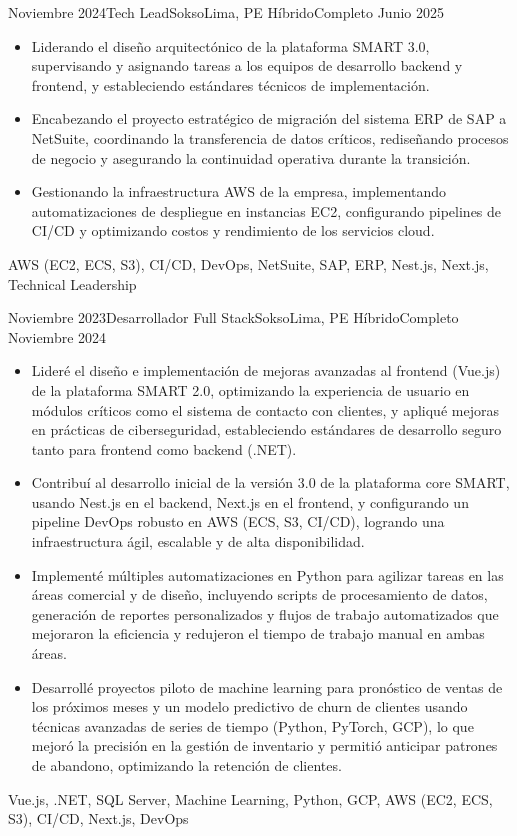 \begin{experiences}
\experience
  {Noviembre 2024}{Tech Lead}{Sokso}{Lima, PE}
  {Híbrido}{Completo}
  {Junio 2025} {
    \begin{itemize}
      \item Liderando el diseño arquitectónico de la plataforma SMART 3.0, supervisando y asignando tareas a los equipos de desarrollo backend y frontend, y estableciendo estándares técnicos de implementación.
      \item Encabezando el proyecto estratégico de migración del sistema ERP de SAP a NetSuite, coordinando la transferencia de datos críticos, rediseñando procesos de negocio y asegurando la continuidad operativa durante la transición.
      \item Gestionando la infraestructura AWS de la empresa, implementando automatizaciones de despliegue en instancias EC2, configurando pipelines de CI/CD y optimizando costos y rendimiento de los servicios cloud.
    \end{itemize}
  }
  {{AWS (EC2, ECS, S3)}, CI/CD, DevOps, NetSuite, SAP, ERP, Nest.js, Next.js, Technical Leadership}

\experience
  {Noviembre 2023}{Desarrollador Full Stack}{Sokso}{Lima, PE}
  {Híbrido}{Completo}
  {Noviembre 2024} {
    \begin{itemize}
      \item Lideré el diseño e implementación de mejoras avanzadas al frontend (Vue.js) de la plataforma SMART 2.0, optimizando la experiencia de usuario en módulos críticos como el sistema de contacto con clientes, y apliqué mejoras en prácticas de ciberseguridad, estableciendo estándares de desarrollo seguro tanto para frontend como backend (.NET).
      \item Contribuí al desarrollo inicial de la versión 3.0 de la plataforma core SMART, usando Nest.js en el backend, Next.js en el frontend, y configurando un pipeline DevOps robusto en AWS (ECS, S3, CI/CD), logrando una infraestructura ágil, escalable y de alta disponibilidad.
      \item Implementé múltiples automatizaciones en Python para agilizar tareas en las áreas comercial y de diseño, incluyendo scripts de procesamiento de datos, generación de reportes personalizados y flujos de trabajo automatizados que mejoraron la eficiencia y redujeron el tiempo de trabajo manual en ambas áreas.
      \item Desarrollé proyectos piloto de machine learning para pronóstico de ventas de los próximos meses y un modelo predictivo de churn de clientes usando técnicas avanzadas de series de tiempo (Python, PyTorch, GCP), lo que mejoró la precisión en la gestión de inventario y permitió anticipar patrones de abandono, optimizando la retención de clientes.
    \end{itemize}
  }
  {Vue.js, .NET, SQL Server, Machine Learning, Python, GCP, {AWS (EC2, ECS, S3)}, CI/CD, Next.js, DevOps}


\end{experiences}
